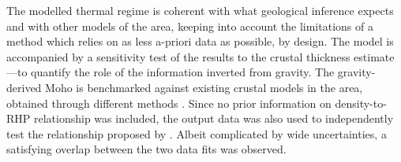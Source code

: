 The modelled thermal regime is coherent with what geological inference expects and with other models of the area, keeping into account the limitations of a method which relies on as less a-priori data as possible, by design.
The model is accompanied by a sensitivity test of the results to the crustal thickness estimate ---to quantify the role of the information inverted from gravity.
The gravity-derived Moho is benchmarked against existing crustal models in the area, obtained through different methods \parencites{Grad2009}{Pasyanos2014}{Reguzzoni2015}.
Since no prior information on density-to-RHP relationship was included, the output data was also used to independently test the relationship proposed by \textcite{Hasterok2017_ign}.
Albeit complicated by wide uncertainties, a satisfying overlap between the two data fits was observed.
\\

\nocite{Pastorutti2019}






